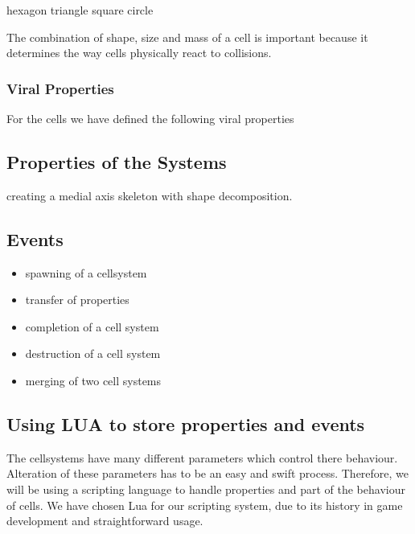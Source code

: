 \documentclass{article}
\begin{document}
hexagon triangle square circle

The combination of shape, size and mass of a cell is important because it determines the way cells physically react to collisions.

\subsubsection{Viral Properties}

For the cells we have defined the following viral properties







\subsection{Properties of the Systems}


creating a medial axis skeleton with shape decomposition.


\subsection{Events}

\begin{itemize}
\item spawning of a cellsystem
\item transfer of properties
\item completion of a cell system
\item destruction of a cell system
\item merging of two cell systems
\end{itemize}

\subsection{Using LUA to store properties and events}

The cellsystems have many different parameters which control there behaviour. Alteration of these parameters has to be an easy and swift process. Therefore, we will be using a scripting language to handle properties and part of the behaviour of cells. We have chosen Lua for our scripting system, due to its history in game development and straightforward usage.
\end{document}

